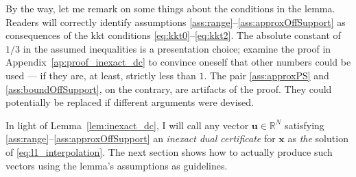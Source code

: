 By the way, let me remark on some things about the conditions in the lemma. Readers will correctly identify assumptions \ref{ass:range}--\ref{ass:approxOffSupport} as consequences of the \acrshort{kkt} conditions \ref{eq:kkt0}--\ref{eq:kkt2}. The absolute constant of $1/3$ in the assumed inequalities is a presentation choice; examine the proof in Appendix~\ref{ap:proof_inexact_dc} to convince oneself that other numbers could be used --- if they are, at least, strictly less than $1$. The pair \ref{ass:approxPS} and \ref{ass:boundOffSupport}, on the contrary, are artifacts of the proof. They could potentially be replaced if different arguments were devised.

In light of Lemma~\ref{lem:inexact_dc}, I will call any vector $\mathbf{u} \in \mathbb{R}^{N}$ satisfying \ref{ass:range}--\ref{ass:approxOffSupport} an \emph{inexact dual certificate} for $\mathbf{x}$ as \emph{the} solution of \ref{eq:l1_interpolation}. The next section shows how to actually produce such vectors using the lemma's assumptions as guidelines.